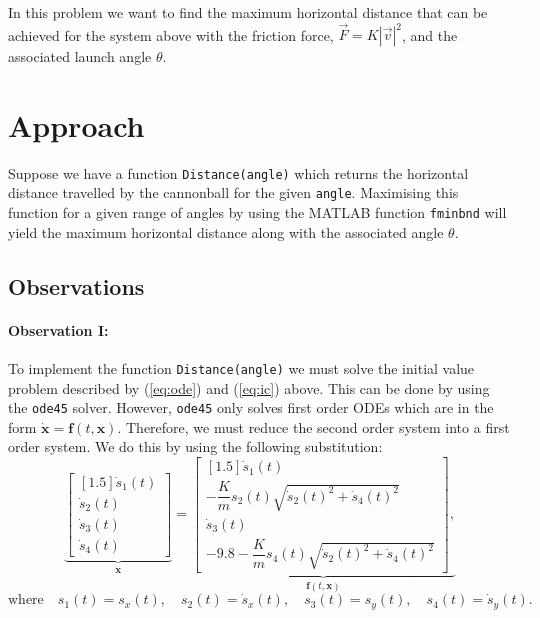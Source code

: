 \documentclass[11pt]{report}
\begin{document}
In this problem we want to find the maximum horizontal distance that can be achieved for the system above with the friction force, $\vec{F}=K |\vec{v}|^2$, and the associated launch angle $\theta$.

\section{Approach}

Suppose we have a function \texttt{Distance(angle)} which returns the horizontal distance travelled by the cannonball for the given \texttt{angle}. Maximising this function for a given range of angles by using the MATLAB function \texttt{fminbnd} will yield the maximum horizontal distance along with the associated angle $\theta$.

\subsection{Observations}
\paragraph{Observation I:} To implement the function \texttt{Distance(angle)} we must solve the initial value problem described by (\ref{eq:ode}) and (\ref{eq:ic}) above. This can be done by using the \texttt{ode45} solver. However, \texttt{ode45} only solves first order ODEs which are in the form $\dot{\boldsymbol{x}}=\boldsymbol{f}(t,\boldsymbol{x})$. Therefore, we must reduce the second order system into a first order system. We do this by using the following substitution:
	\begin{equation}
		\underbrace{
		\begin{bmatrix}[1.5]
			\dot{s}_1(t) \\ \dot{s}_2(t) \\ \dot{s}_3(t) \\ \dot{s}_4(t)
		\end{bmatrix}
		}_{\boldsymbol{\dot{x}}}
		=
		\underbrace{
		\begin{bmatrix}[1.5]
			\dot{s}_1(t) \\ -\dfrac{K}{m}s_2(t)\sqrt{\dot{s}_2(t)^2 + \dot{s}_4(t)^2} \\ \dot{s}_3(t) \\ -9.8 -\dfrac{K}{m}s_4(t)\sqrt{\dot{s}_2(t)^2 + \dot{s}_4(t)^2}
		\end{bmatrix},
		}_{\boldsymbol{f}(t,\boldsymbol{x})}
		\label{eq:ode45}
	\end{equation}
	$$\text{where}\quad s_1(t)=s_x(t), \quad s_2(t)=\dot{s}_x(t), \quad s_3(t)=s_y(t), \quad s_4(t)=\dot{s}_y(t).$$
		
\end{document}
